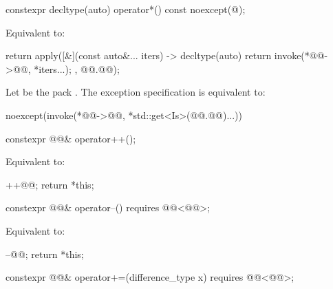 %
\begin{itemdecl}
constexpr decltype(auto) operator*() const noexcept(@\seebelow@);
\end{itemdecl}

\begin{itemdescr}
\pnum
\effects
Equivalent to:
\begin{codeblock}
return apply([&](const auto&... iters) -> decltype(auto) {
  return invoke(*@@->@@, *iters...);
}, @@.@@);
\end{codeblock}

\pnum
\remarks
Let  be the pack .
The exception specification is equivalent to:
\begin{codeblock}
noexcept(invoke(*@@->@@, *std::get<Is>(@@.@@)...))
\end{codeblock}
\end{itemdescr}

%
\begin{itemdecl}
constexpr @@& operator++();
\end{itemdecl}

\begin{itemdescr}
\pnum
\effects
Equivalent to:
\begin{codeblock}
++@@;
return *this;
\end{codeblock}
\end{itemdescr}

%
\begin{itemdecl}
constexpr @@& operator--() requires @@<@@>;
\end{itemdecl}

\begin{itemdescr}
\pnum
\effects
Equivalent to:
\begin{codeblock}
--@@;
return *this;
\end{codeblock}
\end{itemdescr}

%
\begin{itemdecl}
constexpr @@& operator+=(difference_type x) requires @@<@@>;
\end{itemdecl}

